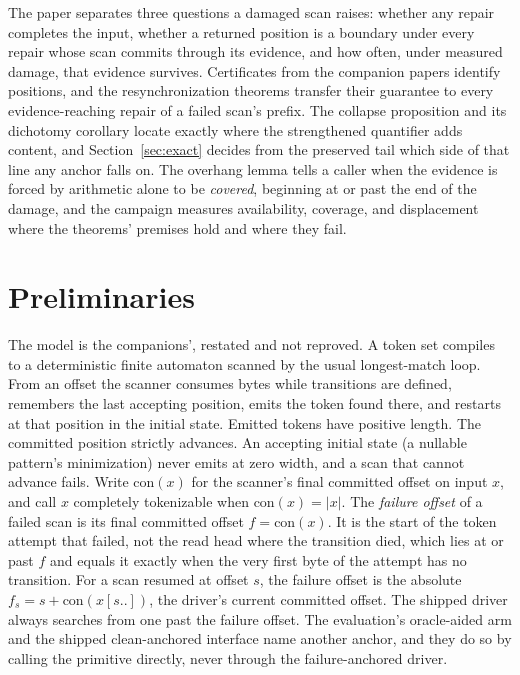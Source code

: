 \documentclass[11pt,a4paper]{article}
\theoremstyle{definition}
\theoremstyle{plain}
\theoremstyle{remark}
\begin{document}
The paper separates three questions a damaged scan raises: whether any repair completes the input, whether a returned
position is a boundary under every repair whose scan commits through its evidence, and how often, under measured damage,
that evidence survives. Certificates from the companion papers identify positions, and the resynchronization theorems
transfer their guarantee to every evidence-reaching repair of a failed scan's prefix. The collapse proposition and its
dichotomy corollary locate exactly where the strengthened quantifier adds content, and Section~\ref{sec:exact} decides
from the preserved tail which side of that line any anchor falls on. The overhang lemma tells a caller when the evidence
is forced by arithmetic alone to be \emph{covered}, beginning at or past the end of the damage, and the campaign
measures availability, coverage, and displacement where the theorems' premises hold and where they fail.

\section{Preliminaries}

The model is the companions', restated and not reproved. A token set compiles to a deterministic finite automaton
scanned by the usual longest-match loop. From an offset the scanner consumes bytes while transitions are defined,
remembers the last accepting position, emits the token found there, and restarts at that position in the initial state.
Emitted tokens have positive length. The committed position strictly advances. An accepting initial state (a nullable
pattern's minimization) never emits at zero width, and a scan that cannot advance fails. Write $\mathrm{con}(x)$ for the
scanner's final committed offset on input $x$, and call $x$ completely tokenizable when $\mathrm{con}(x) = |x|$. The
\emph{failure offset} of a failed scan is its final committed offset $f = \mathrm{con}(x)$. It is the start of the token
attempt that failed, not the read head where the transition died, which lies at or past $f$ and equals it exactly when
the very first byte of the attempt has no transition. For a scan resumed at offset $s$, the failure offset is the
absolute $f_s = s + \mathrm{con}(x[s..])$, the driver's current committed offset. The shipped driver always searches
from one past the failure offset. The evaluation's oracle-aided arm and the shipped clean-anchored interface name
another anchor, and they do so by calling the primitive directly, never through the failure-anchored driver.
\end{document}
